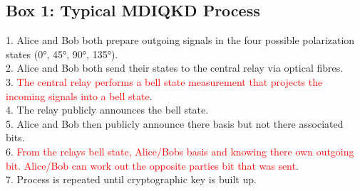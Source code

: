 \documentclass[journal]{vgtc}
\begin{document}
\begin{tcolorbox}
\section{Box 1: Typical MDIQKD Process}

1. Alice and Bob both prepare outgoing signals in the four possible polarization states (\ang{0}, \ang{45}, \ang{90}, \ang{135}).\\
2. Alice and Bob both send their states to the central relay via optical fibres.\\
3. \textcolor{red}{The central relay performs a bell state measurement that projects the incoming signals into a bell state}.\\
4. The relay publicly announces the bell state.\\
5. Alice and Bob then publicly announce there basis but not there associated bits.\\
6. \textcolor{red}{From the relays bell state, Alice/Bobs basis and knowing there own outgoing bit. Alice/Bob can work out the opposite parties bit that was sent}.\\
7. Process is repeated until cryptographic key is built up.

\end{tcolorbox}
\end{document}
